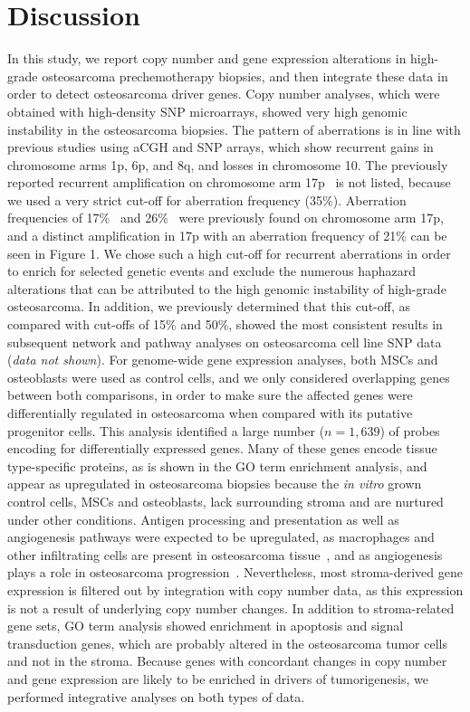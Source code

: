 \section{Discussion}\label{discussion7}
In this study, we report copy number and gene
expression alterations in high\hyp{}grade osteosarcoma
prechemotherapy biopsies, and then integrate
these data in order to detect osteosarcoma driver
genes. Copy number analyses, which were
obtained with high\hyp{}density SNP microarrays,
showed very high genomic instability in the osteosarcoma
biopsies. The pattern of aberrations is
in line with previous studies using aCGH and
SNP arrays, which show recurrent gains in chromosome
arms 1p, 6p, and 8q, and losses in chromosome
10. The previously reported recurrent
amplification on chromosome arm 17p~\cite{squire2003high,man2004genome,atiye2005gene,yen2009identification}
is not listed, because we used a
very strict cut-off for aberration frequency (35\%).
Aberration frequencies of 17\%~\cite{man2004genome}
and 26\%~\cite{yen2009identification} were previously found
on chromosome arm 17p, and a distinct amplification
in 17p with an aberration frequency of 21\%
can be seen in Figure 1. We chose such a high
cut-off for recurrent aberrations in order to enrich
for selected genetic events and exclude the
numerous haphazard alterations that can be
attributed to the high genomic instability of high\hyp{}grade
osteosarcoma. In addition, we previously
determined that this cut-off, as compared with
cut-offs of 15\% and 50\%, showed the most consistent
results in subsequent network and pathway
analyses on osteosarcoma cell line SNP data
({\it data not shown}). For genome\hyp{}wide gene expression
analyses, both MSCs and osteoblasts were
used as control cells, and we only considered
overlapping genes between both comparisons, in
order to make sure the affected genes were differentially
regulated in osteosarcoma when compared
with its putative progenitor cells. This
analysis identified a large number ($n=1,639$) of 
probes encoding for differentially expressed
genes. Many of these genes encode tissue type\hyp{}specific
proteins, as is shown in the GO term
enrichment analysis, and appear as upregulated in
osteosarcoma biopsies because the {\it in vitro} grown
control cells, MSCs and osteoblasts, lack surrounding
stroma and are nurtured under other
conditions. Antigen processing and presentation
as well as angiogenesis pathways were expected
to be upregulated, as macrophages and other
infiltrating cells are present in osteosarcoma tissue~\cite{buddingh2011tumor}, and as angiogenesis
plays a role in osteosarcoma progression~\cite{lee1999cell}.
Nevertheless, most stroma\hyp{}derived
gene expression is filtered out by integration with
copy number data, as this expression is not a
result of underlying copy number changes. In
addition to stroma\hyp{}related gene sets, GO term
analysis showed enrichment in apoptosis and signal
transduction genes, which are probably
altered in the osteosarcoma tumor cells and not
in the stroma. Because genes with concordant
changes in copy number and gene expression are
likely to be enriched in drivers of tumorigenesis,
we performed integrative analyses on both types
of data.

